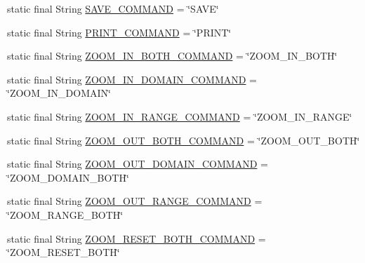 \begin{DoxyCompactItemize}
\item 
static final String \mbox{\hyperlink{classorg_1_1jfree_1_1experimental_1_1chart_1_1swt_1_1_chart_composite_a909082862315e82dc2c2fa4c186ea477}{S\+A\+V\+E\+\_\+\+C\+O\+M\+M\+A\+ND}} = \char`\"{}S\+A\+VE\char`\"{}
\item 
static final String \mbox{\hyperlink{classorg_1_1jfree_1_1experimental_1_1chart_1_1swt_1_1_chart_composite_a5a0054eef7dde0b4fa601eac53c9c404}{P\+R\+I\+N\+T\+\_\+\+C\+O\+M\+M\+A\+ND}} = \char`\"{}P\+R\+I\+NT\char`\"{}
\item 
static final String \mbox{\hyperlink{classorg_1_1jfree_1_1experimental_1_1chart_1_1swt_1_1_chart_composite_a9a040562aaead725f8f405da78ae2d6b}{Z\+O\+O\+M\+\_\+\+I\+N\+\_\+\+B\+O\+T\+H\+\_\+\+C\+O\+M\+M\+A\+ND}} = \char`\"{}Z\+O\+O\+M\+\_\+\+I\+N\+\_\+\+B\+O\+TH\char`\"{}
\item 
static final String \mbox{\hyperlink{classorg_1_1jfree_1_1experimental_1_1chart_1_1swt_1_1_chart_composite_a49898c19c475daa756a01683bda3938a}{Z\+O\+O\+M\+\_\+\+I\+N\+\_\+\+D\+O\+M\+A\+I\+N\+\_\+\+C\+O\+M\+M\+A\+ND}} = \char`\"{}Z\+O\+O\+M\+\_\+\+I\+N\+\_\+\+D\+O\+M\+A\+IN\char`\"{}
\item 
static final String \mbox{\hyperlink{classorg_1_1jfree_1_1experimental_1_1chart_1_1swt_1_1_chart_composite_aabbf95dc5639de6cd0564eff91551117}{Z\+O\+O\+M\+\_\+\+I\+N\+\_\+\+R\+A\+N\+G\+E\+\_\+\+C\+O\+M\+M\+A\+ND}} = \char`\"{}Z\+O\+O\+M\+\_\+\+I\+N\+\_\+\+R\+A\+N\+GE\char`\"{}
\item 
static final String \mbox{\hyperlink{classorg_1_1jfree_1_1experimental_1_1chart_1_1swt_1_1_chart_composite_ae3a6c486704c5ed1b99a3a787664fc46}{Z\+O\+O\+M\+\_\+\+O\+U\+T\+\_\+\+B\+O\+T\+H\+\_\+\+C\+O\+M\+M\+A\+ND}} = \char`\"{}Z\+O\+O\+M\+\_\+\+O\+U\+T\+\_\+\+B\+O\+TH\char`\"{}
\item 
static final String \mbox{\hyperlink{classorg_1_1jfree_1_1experimental_1_1chart_1_1swt_1_1_chart_composite_af4bf5d93294c2c1a3eca3621f398761d}{Z\+O\+O\+M\+\_\+\+O\+U\+T\+\_\+\+D\+O\+M\+A\+I\+N\+\_\+\+C\+O\+M\+M\+A\+ND}} = \char`\"{}Z\+O\+O\+M\+\_\+\+D\+O\+M\+A\+I\+N\+\_\+\+B\+O\+TH\char`\"{}
\item 
static final String \mbox{\hyperlink{classorg_1_1jfree_1_1experimental_1_1chart_1_1swt_1_1_chart_composite_ab5c955bf1b70c025aeb5560ba68bacb8}{Z\+O\+O\+M\+\_\+\+O\+U\+T\+\_\+\+R\+A\+N\+G\+E\+\_\+\+C\+O\+M\+M\+A\+ND}} = \char`\"{}Z\+O\+O\+M\+\_\+\+R\+A\+N\+G\+E\+\_\+\+B\+O\+TH\char`\"{}
\item 
static final String \mbox{\hyperlink{classorg_1_1jfree_1_1experimental_1_1chart_1_1swt_1_1_chart_composite_a8f3d810c0530ea0c7a09f59594f2d33b}{Z\+O\+O\+M\+\_\+\+R\+E\+S\+E\+T\+\_\+\+B\+O\+T\+H\+\_\+\+C\+O\+M\+M\+A\+ND}} = \char`\"{}Z\+O\+O\+M\+\_\+\+R\+E\+S\+E\+T\+\_\+\+B\+O\+TH\char`\"{}

\end{DoxyCompactItemize}
